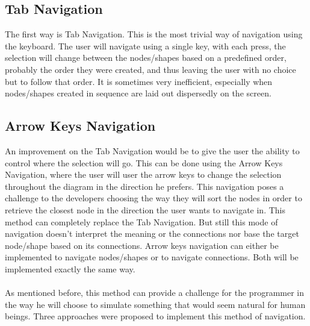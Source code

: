 \subsection{Tab Navigation}
\par \noindent
The first way is Tab Navigation. This is the most trivial way of navigation using the keyboard. The user will navigate using a single key, with each press, the selection will change between the nodes/shapes based on a predefined order, probably the order they were created, and thus leaving the user with no choice but to follow that order. It is sometimes very inefficient, especially when nodes/shapes created in sequence are laid out dispersedly on the screen.

\subsection{Arrow Keys Navigation}
\par \noindent
An improvement on the Tab Navigation would be to give the user the ability to control where the selection will go. This can be done using the Arrow Keys Navigation, where the user will user the arrow keys to change the selection throughout the diagram in the direction he prefers. This navigation poses a challenge to the developers choosing the way they will sort the nodes in order to retrieve the closest node in the direction the user wants to navigate in. This method can completely replace the Tab Navigation. But still this mode of navigation doesn't interpret the meaning or the connections nor base the target node/shape based on its connections.
Arrow keys navigation can either be implemented to navigate nodes/shapes or to navigate connections. Both will be implemented exactly the same way.
\paragraph{}
As mentioned before, this method can provide a challenge for the programmer in the way he will choose to simulate something that would seem natural for human beings. Three approaches were proposed to implement this method of navigation.

